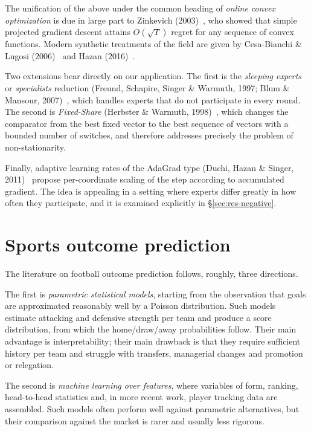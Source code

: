 \documentclass[12pt,a4paper,oneside]{report}
\renewcommand{\_}{\oldunderscore\allowbreak}
\theoremstyle{definition}
\theoremstyle{plain}
\theoremstyle{definition}   %
\begin{document}
The unification of the above under the common heading of \emph{online convex optimization} is
due in large part to Zinkevich (2003)~\cite{zinkevich2003}, who showed that simple projected gradient descent
attains $O(\sqrt{T})$ regret for any sequence of convex functions. Modern synthetic treatments
of the field are given by Cesa-Bianchi \& Lugosi (2006)~\cite{cesabianchi2006} and Hazan (2016)~\cite{hazan2016}.

Two extensions bear directly on our application. The first is the \emph{sleeping experts} or
\emph{specialists} reduction (Freund, Schapire, Singer \& Warmuth, 1997; Blum \& Mansour,
2007)~\cite{freund1997,blum2007}, which handles experts that do not participate in every round. The second is
\emph{Fixed-Share} (Herbster \& Warmuth, 1998)~\cite{herbster1998}, which changes the comparator from the best
fixed vector to the best sequence of vectors with a bounded number of switches, and therefore
addresses precisely the problem of non-stationarity.

Finally, adaptive learning rates of the AdaGrad type (Duchi, Hazan \& Singer, 2011)~\cite{duchi2011} propose
per-coordinate scaling of the step according to accumulated gradient. The idea is appealing in
a setting where experts differ greatly in how often they participate, and it is examined
explicitly in \S\ref{sec:res-negative}.

\section{Sports outcome prediction}

The literature on football outcome prediction follows, roughly, three directions.

The first is \emph{parametric statistical models}, starting from the observation that goals
are approximated reasonably well by a Poisson distribution. Such models estimate attacking and
defensive strength per team and produce a score distribution, from which the home/draw/away
probabilities follow. Their main advantage is interpretability; their main drawback is that
they require sufficient history per team and struggle with transfers, managerial changes and
promotion or relegation.

The second is \emph{machine learning over features}, where variables of form, ranking,
head-to-head statistics and, in more recent work, player tracking data are assembled. Such
models often perform well against parametric alternatives, but their comparison against the
market is rarer and usually less rigorous.
\end{document}
